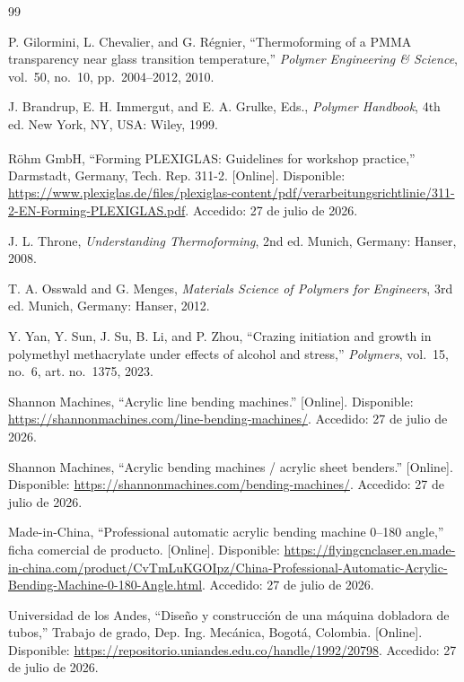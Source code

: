 \clearpage
\singlespacing
{}
\begin{thebibliography}{99}
\footnotesize

P. Gilormini, L. Chevalier, and G. Régnier, ``Thermoforming of a PMMA transparency near glass transition temperature,'' \emph{Polymer Engineering \& Science}, vol.~50, no.~10, pp.~2004--2012, 2010.

J. Brandrup, E. H. Immergut, and E. A. Grulke, Eds., \emph{Polymer Handbook}, 4th ed. New York, NY, USA: Wiley, 1999.

Röhm GmbH, ``Forming PLEXIGLAS\textsuperscript{\textregistered}: Guidelines for workshop practice,'' Darmstadt, Germany, Tech. Rep. 311-2. [Online]. Disponible: \url{https://www.plexiglas.de/files/plexiglas-content/pdf/verarbeitungsrichtlinie/311-2-EN-Forming-PLEXIGLAS.pdf}. Accedido: 27 de julio de 2026.

J. L. Throne, \emph{Understanding Thermoforming}, 2nd ed. Munich, Germany: Hanser, 2008.

T. A. Osswald and G. Menges, \emph{Materials Science of Polymers for Engineers}, 3rd ed. Munich, Germany: Hanser, 2012.

Y. Yan, Y. Sun, J. Su, B. Li, and P. Zhou, ``Crazing initiation and growth in polymethyl methacrylate under effects of alcohol and stress,'' \emph{Polymers}, vol.~15, no.~6, art. no.~1375, 2023.

Shannon Machines, ``Acrylic line bending machines.'' [Online]. Disponible: \url{https://shannonmachines.com/line-bending-machines/}. Accedido: 27 de julio de 2026.

Shannon Machines, ``Acrylic bending machines / acrylic sheet benders.'' [Online]. Disponible: \url{https://shannonmachines.com/bending-machines/}. Accedido: 27 de julio de 2026.

Made-in-China, ``Professional automatic acrylic bending machine 0--180 angle,'' ficha comercial de producto. [Online]. Disponible: \url{https://flyingcnclaser.en.made-in-china.com/product/CvTmLuKGOIpz/China-Professional-Automatic-Acrylic-Bending-Machine-0-180-Angle.html}. Accedido: 27 de julio de 2026.

Universidad de los Andes, ``Diseño y construcción de una máquina dobladora de tubos,'' Trabajo de grado, Dep. Ing. Mecánica, Bogotá, Colombia. [Online]. Disponible: \url{https://repositorio.uniandes.edu.co/handle/1992/20798}. Accedido: 27 de julio de 2026.


\end{thebibliography}
